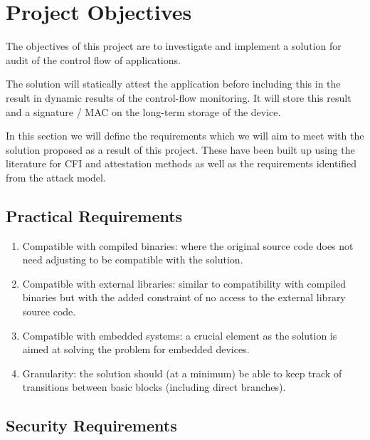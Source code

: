 \section{Project Objectives} \label{projectRequirements}

The objectives of this project are to investigate and implement a solution for audit of the control flow of applications.

The solution will statically attest the application before including this in the result in dynamic results of the control-flow monitoring. It will store this result and a signature / MAC on the long-term storage of the device.

In this section we will define the requirements which we will aim to meet with the solution proposed as a result of this project. These have been built up using the literature for CFI and attestation methods as well as the requirements identified from the attack model.

\subsection{Practical Requirements}

\begin{enumerate}
	\item Compatible with compiled binaries: where the original source code does not need adjusting to be compatible with the solution.
	\item Compatible with external libraries: similar to compatibility with compiled binaries but with the added constraint of no access to the external library source code. 
	\item Compatible with embedded systems: a crucial element as the solution is aimed at solving the problem for embedded devices.
	\item Granularity: the solution should (at a minimum) be able to keep track of transitions between basic blocks (including direct branches).
\end{enumerate}

\subsection{Security Requirements}
 
